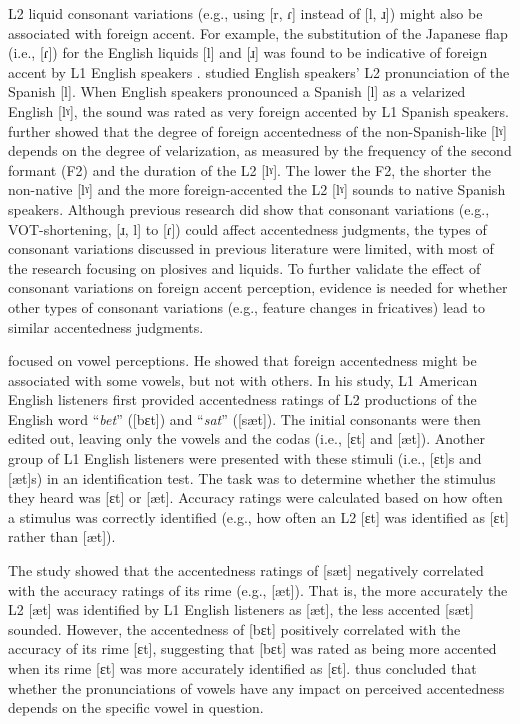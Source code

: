 L2 liquid consonant variations (e.g., using [r, ɾ] instead of [l, ɹ]) might also be associated with foreign accent. For example, the substitution of the Japanese flap (i.e., [ɾ]) for the English liquids [l] and [ɹ] was found to be indicative of foreign accent by L1 English speakers \citep{Riney_2000}. \citet{Solon_2015} studied English speakers’ L2 pronunciation of the Spanish [l].  When English speakers pronounced a Spanish [l] as a velarized English [lˠ], the sound was rated as very foreign accented by L1 Spanish speakers. \citet{Solon_2015} further showed that the degree of foreign accentedness of the non-Spanish-like [lˠ] depends on the degree of velarization, as measured by the frequency of the second formant (F2) and the duration of the L2 [lˠ]. The lower the F2, the shorter the non-native [lˠ] and the more foreign-accented the L2 [lˠ] sounds to native Spanish speakers. Although previous research did show that consonant variations (e.g., VOT-shortening, [ɹ, l] to [ɾ]) could affect accentedness judgments, the types of consonant variations discussed in previous literature were limited, with most of the research focusing on plosives and liquids. To further validate the effect of consonant variations on foreign accent perception, evidence is needed for whether other types of consonant variations (e.g., feature changes in fricatives) lead to similar accentedness judgments.

\citet{Major_1987} focused on vowel perceptions. He showed that foreign accentedness might be associated with some vowels, but not with others. In his study, L1 American English listeners first provided accentedness ratings of L2 productions of the English word “\textit{bet}” ([bɛt]) and “\textit{sat}” ([sæt]). The initial consonants were then edited out, leaving only the vowels and the codas (i.e., [ɛt] and [æt]). Another group of L1 English listeners were presented with these stimuli (i.e., [ɛt]s and [æt]s) in an identification test. The task was to determine whether the stimulus they heard was [ɛt] or [æt]. Accuracy ratings were calculated based on how often a stimulus was correctly identified (e.g., how often an L2 [ɛt] was identified as [ɛt] rather than [æt]).  

The study showed that the accentedness ratings of [sæt] negatively correlated with the accuracy ratings of its rime (e.g., [æt]).  That is, the more accurately the L2 [æt] was identified by L1 English listeners as [æt], the less accented [sæt] sounded. However, the accentedness of [bɛt] positively correlated with the accuracy of its rime [ɛt], suggesting that [bɛt] was rated as being more accented when its rime [ɛt] was more accurately identified as [ɛt]. \citet{Major_1987} thus concluded that whether the pronunciations of vowels have any impact on perceived accentedness depends on the specific vowel in question. 

